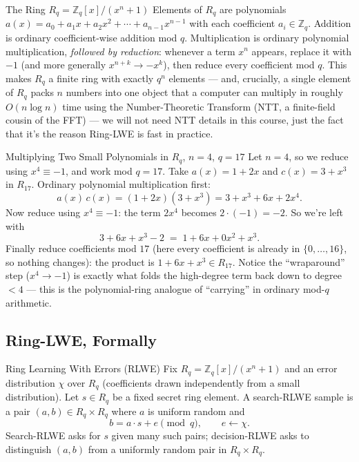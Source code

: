 \begin{defbox}{The Ring $R_q = \mathbb{Z}_q[x]/(x^n+1)$}
Elements of $R_q$ are polynomials $a(x) = a_0 + a_1 x + a_2 x^2 + \cdots + a_{n-1}x^{n-1}$ with each coefficient $a_i \in \mathbb{Z}_q$. Addition is ordinary coefficient-wise addition mod $q$. Multiplication is ordinary polynomial multiplication, \emph{followed by reduction}: whenever a term $x^n$ appears, replace it with $-1$ (and more generally $x^{n+k} \to -x^k$), then reduce every coefficient mod $q$. This makes $R_q$ a finite ring with exactly $q^n$ elements --- and, crucially, a single element of $R_q$ packs $n$ numbers into one object that a computer can multiply in roughly $O(n \log n)$ time using the Number-Theoretic Transform (NTT, a finite-field cousin of the FFT) --- we will not need NTT details in this course, just the fact that it's the reason Ring-LWE is fast in practice.
\end{defbox}

\begin{exbox}{Multiplying Two Small Polynomials in $R_q$, $n=4$, $q=17$}
Let $n=4$, so we reduce using $x^4 \equiv -1$, and work mod $q=17$. Take $a(x) = 1 + 2x$ and $c(x) = 3 + x^3$ in $R_{17}$. Ordinary polynomial multiplication first:
$$
a(x)\,c(x) = (1+2x)(3+x^3) = 3 + x^3 + 6x + 2x^4.
$$
Now reduce using $x^4 \equiv -1$: the term $2x^4$ becomes $2 \cdot(-1) = -2$. So we're left with
$$
3 + 6x + x^3 - 2 \;=\; 1 + 6x + 0x^2 + x^3.
$$
Finally reduce coefficients mod $17$ (here every coefficient is already in $\{0,\ldots,16\}$, so nothing changes): the product is $1 + 6x + x^3 \in R_{17}$. Notice the ``wraparound'' step ($x^4 \to -1$) is exactly what folds the high-degree term back down to degree $<4$ --- this is the polynomial-ring analogue of ``carrying'' in ordinary mod-$q$ arithmetic.
\end{exbox}

\subsection{Ring-LWE, Formally}
\label{sec:L2:ring-lwe-formally}

\begin{defbox}{Ring Learning With Errors (RLWE)}
Fix $R_q = \mathbb{Z}_q[x]/(x^n+1)$ and an error distribution $\chi$ over $R_q$ (coefficients drawn independently from a small distribution). Let $s \in R_q$ be a fixed secret ring element. A search-RLWE sample is a pair $(a, b) \in R_q \times R_q$ where $a$ is uniform random and
$$
b = a \cdot s + e \pmod{q}, \qquad e \leftarrow \chi.
$$
Search-RLWE asks for $s$ given many such pairs; decision-RLWE asks to distinguish $(a,b)$ from a uniformly random pair in $R_q \times R_q$.
\end{defbox}

